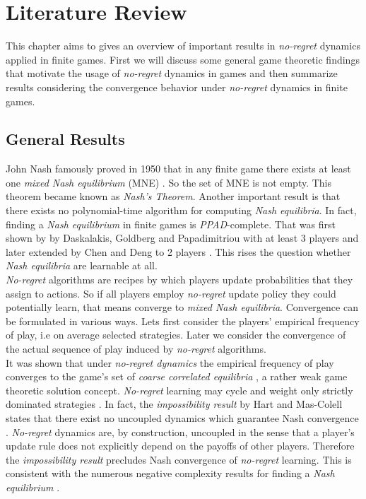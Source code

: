
\chapter{Literature Review}\label{chapter:literatureReview}

This chapter aims to gives an overview of important results in \textit{no-regret} dynamics applied in finite games. First we will discuss some general game theoretic findings that motivate the usage of \textit{no-regret} dynamics in games and then summarize results considering the convergence behavior under \textit{no-regret} dynamics in finite games. \\

\section{General Results}\label{section:generalResults}

John Nash famously proved in 1950 that in any finite game there exists at least one \textit{mixed Nash equilibrium} (MNE) \cite{nash}. So the set of MNE is not empty. This theorem became known as \textit{Nash's Theorem}. Another important result is that there exists no polynomial-time algorithm for computing \textit{Nash equilibria}. In fact,  finding a \textit{Nash equilibrium} in finite games is \textit{PPAD}-complete. That was first shown by by Daskalakis, Goldberg and Papadimitriou  with at least 3 players \cite{daskalakis} and later extended by Chen and Deng to 2 players \cite{chen}. This rises the question whether \textit{Nash equilibria} are learnable at all. \\

\textit{No-regret} algorithms are recipes by which players update probabilities that they assign to actions. So if all players employ \textit{no-regret} update policy they could potentially learn, that means converge to \textit{mixed Nash equilibria}.  Convergence can be formulated in various ways. Lets first consider the players' empirical frequency of play, i.e on average selected strategies. Later we consider the convergence of the actual sequence of play induced by \textit{no-regret} algorithms.\\

It was shown that under \textit{no-regret dynamics} the empirical frequency of play converges to the game's set of \textit{coarse correlated equilibria} \cite{flokas}, a rather weak game theoretic solution concept. \textit{No-regret} learning may cycle and weight only strictly dominated strategies \cite{mertikopoulos}. In fact, the \textit{impossibility result} by Hart and Mas-Colell states that there exist no uncoupled dynamics which guarantee Nash convergence \cite{hart}. \textit{No-regret} dynamics are, by construction, uncoupled in the sense that a player’s update rule does not explicitly depend on the payoffs of other players. Therefore the \textit{impossibility result} precludes Nash convergence of \textit{no-regret} learning. This is consistent with the numerous negative complexity results for finding a \textit{Nash equilibrium} \cite{chen, daskalakis}. \\

